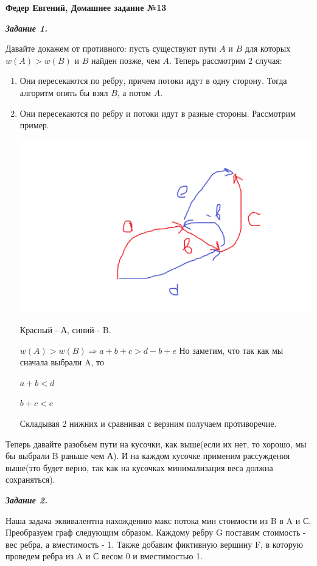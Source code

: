 \documentclass[12pt, a4paper]{scrartcl}
\begin{document}
	\LARGE{\textbf{Федер Евгений, Домашнее задание №13}}\par
	
	\emph{\textbf{Задание 1.}}\par
	Давайте докажем от противного: пусть существуют пути $A$ и $B$ для которых $w(A) > w(B)$ и $B$ найден позже, чем $A$. Теперь рассмотрим 2 случая:
	\begin{enumerate}
	
	\item Они пересекаются по ребру, причем потоки идут в одну сторону. Тогда алгоритм опять бы взял $B$, а потом $A$.
	
	\item Они пересекаются по ребру и потоки идут в разные стороны. Рассмотрим 
	пример.\par
	\includegraphics[scale=0.5]{ex1.png}\par
	Красный - А, синий - B.\par
	$w(A) > w(B) \Rightarrow a + b + c > d - b + e$ Но заметим, что так как мы сначала выбрали A, то\par
	$a + b < d$\par
	$b + c < e$\par
	Складывая 2 нижних и сравнивая с верзним получаем противоречие.
	\end{enumerate}
	Теперь давайте разобьем пути на кусочки, как выше(если их нет, то хорошо, мы бы выбрали B раньше чем А). И на каждом кусочке применим рассуждения выше(это будет верно, так как на кусочках минимализация веса должна сохраняться).
	
	\emph{\textbf{Задание 2.}}\par
	Наша задача эквивалентна нахождению макс потока мин стоимости из B в A и С. Преобразуем граф следующим образом. Каждому ребру G поставим стоимость - вес ребра, а вместимость - 1. Также добавим фиктивную вершину F, в которую проведем ребра из A и С весом 0 и вместимостью 1.\par 
	
\end{document}
